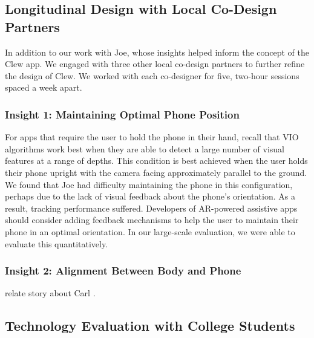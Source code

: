 \documentclass[chi_draft]{sigchi}
\begin{document}
\subsection{Longitudinal Design with Local Co-Design Partners}
In addition to our work with Joe, whose insights helped inform the concept of the Clew app.  We engaged with three other local co-design partners to further refine the design of Clew.  We worked with each co-designer for five, two-hour sessions spaced a week apart.

\subsubsection{Insight 1: Maintaining Optimal Phone Position}
For apps that require the user to hold the phone in their hand, recall that VIO algorithms work best when they are able to detect a large number of visual features at a range of depths.  This condition is best achieved when the user holds their phone upright with the camera facing approximately parallel to the ground.  We found that Joe had difficulty maintaining the phone in this configuration, perhaps due to the lack of visual feedback about the phone's orientation.  As a result, tracking performance suffered.  Developers of AR-powered assistive apps should consider adding feedback mechanisms to help the user to maintain their phone in an optimal orientation.  In our large-scale evaluation, we were able to evaluate this quantitatively.

\subsubsection{Insight 2: Alignment Between Body and Phone}
relate story about Carl .

\subsection{Technology Evaluation with College Students}
\end{document}
